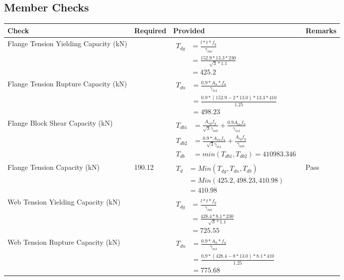 \documentclass{article}%
\begin{document}
%
\subsection{Member Checks}%
\label{subsec:MemberChecks}%
\renewcommand{\arraystretch}{1.2}%
\begin{longtable}{|p{4cm}|p{6cm}|p{5.5cm}|p{1.5cm}|}%
\hline%
\rowcolor{OsdagGreen}%
Check&Required&Provided&Remarks\\%
\hline%
\endhead%
\hline%
Flange Tension Yielding Capacity (kN)&&$\begin{aligned} T_{dg} &= \frac{l*t*f_y}{\gamma_{mo}}\\ &=\frac{152.9*13.3*230}{\sqrt{3}*1.1}\\ &=425.2\end{aligned}$&\\%
\hline%
Flange Tension Rupture Capacity (kN)&&$\begin{aligned} T_{dn} &= \frac{0.9*A_{n}*f_u}{\gamma_{m1}}\\ &=\frac{0.9*(152.9-2*13.0)*13.3*410}{1.25}\\ &=498.23\end{aligned}$&\\%
\hline%
Flange Block Shear Capacity (kN)&&$\begin{aligned}T_{db1} &= \frac{A_{vg} f_{y}}{\sqrt{3} \gamma_{m0}} + \frac{0.9 A_{tn} f_{u}}{\gamma_{m1}}\\ T_{db2} &= \frac{0.9*A_{vn} f_{u}}{\sqrt{3} \gamma_{m1}} + \frac{A_{tg} f_{y}}{\gamma_{m0}}\\ T_{db} &= min(T_{db1}, T_{db2})= 410983.346\end{aligned}$&\\%
\hline%
Flange Tension Capacity (kN)&190.12&$\begin{aligned} T_d &= Min(T_{dg},T_{dn},T_{db})\\ &= Min(425.2,498.23,410.98)\\ &=410.98\end{aligned}$&Pass\\%
\hline%
Web Tension Yielding Capacity (kN)&&$\begin{aligned} T_{dg} &= \frac{l*t*f_y}{\gamma_{mo}}\\ &=\frac{428.4*8.1*230}{\sqrt{3}*1.1}\\ &=725.55\end{aligned}$&\\%
\hline%
Web Tension Rupture Capacity (kN)&&$\begin{aligned} T_{dn} &= \frac{0.9*A_{n}*f_u}{\gamma_{m1}}\\ &=\frac{0.9*(428.4-8*13.0)*8.1*410}{1.25}\\ &=775.68\end{aligned}$&\\%

\end{longtable}
\end{document}
